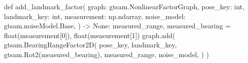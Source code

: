 \begin{pythoncode}
def add_landmark_factor(
    graph: gtsam.NonlinearFactorGraph,
    pose_key: int,
    landmark_key: int,
    measurement: np.ndarray,
    noise_model: gtsam.noiseModel.Base,
) -> None:
    measured_range, measured_bearing = float(measurement[0]), float(measurement[1])
    graph.add(
        gtsam.BearingRangeFactor2D(
            pose_key,
            landmark_key,
            gtsam.Rot2(measured_bearing),
            measured_range,
            noise_model,
        )
    )
\end{pythoncode}
